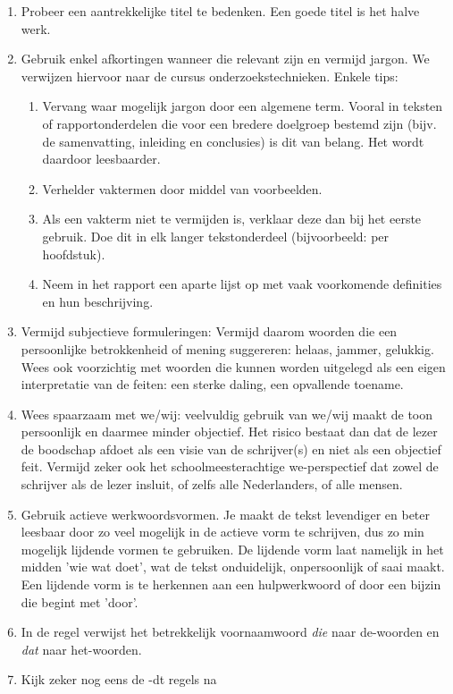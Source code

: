 \begin{enumerate}
	\item Probeer een aantrekkelijke titel te bedenken. Een goede titel is het halve werk.
	\item Gebruik enkel afkortingen wanneer die relevant zijn en vermijd jargon. We verwijzen hiervoor naar de cursus onderzoekstechnieken. Enkele tips:
	\begin{enumerate}
		\item Vervang waar mogelijk jargon door een algemene term. Vooral in teksten of rapportonderdelen die voor een bredere doelgroep bestemd zijn (bijv. de samenvatting, inleiding en conclusies) is dit van belang. Het wordt daardoor leesbaarder.
		\item Verhelder vaktermen door middel van voorbeelden.
		\item Als een vakterm niet te vermijden is, verklaar deze dan bij het eerste gebruik. Doe dit in elk langer tekstonderdeel (bijvoorbeeld: per hoofdstuk).
		\item Neem in het rapport een aparte lijst op met vaak voorkomende definities en hun beschrijving.
	\end{enumerate} 
\item Vermijd subjectieve formuleringen: Vermijd daarom woorden die een persoonlijke betrokkenheid of mening suggereren: helaas, jammer, gelukkig. Wees ook voorzichtig met woorden die kunnen worden uitgelegd als een eigen interpretatie van de feiten: een sterke daling, een opvallende toename.
\item Wees spaarzaam met we/wij: veelvuldig gebruik van we/wij maakt de toon persoonlijk en daarmee minder objectief. Het risico bestaat dan dat de lezer de boodschap afdoet als een visie van de schrijver(s) en niet als een objectief feit. Vermijd zeker ook het schoolmeesterachtige we-perspectief dat zowel de schrijver als de lezer insluit, of zelfs alle Nederlanders, of alle mensen.
\item Gebruik actieve werkwoordsvormen.
Je maakt de tekst levendiger en beter leesbaar door zo veel mogelijk in de actieve vorm te schrijven, dus zo min mogelijk lijdende vormen te gebruiken. De lijdende vorm laat namelijk in het midden 'wie wat doet', wat de tekst onduidelijk, onpersoonlijk of saai maakt. Een lijdende vorm is te herkennen aan een hulpwerkwoord of door een bijzin die begint met 'door'.
\item In de regel verwijst het betrekkelijk voornaamwoord \textit{die} naar de-woorden en \textit{dat} naar het-woorden.
\item Kijk zeker nog eens de -dt regels na
\end{enumerate}

